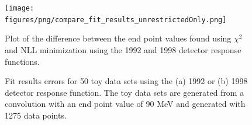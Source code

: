 \begin{figure}[h]
  \centering
  \texttt{[image: figures/png/compare\_fit\_results\_unrestrictedOnly.png]}
  \caption{Plot of the difference between the end point values found using $\chi^2$ and
    NLL minimization using the 1992 and 1998 detector response functions.}
  \label{fig:compareFits}
\end{figure}



\begin{figure}[h]
  \centering
  \hfill
  \caption{Fit results errors for 50 toy data sets using the (a) 1992 or (b) 1998 detector response function.
    The toy data sets are generated from a convolution with an end point value of 90 MeV and generated
    with 1275 data points.
  }
  \label{fig:ToyFitErrs}
\end{figure}


